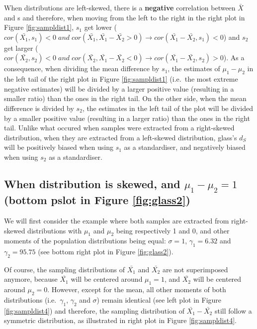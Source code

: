 \documentclass[
  man,floatsintext]{apa6}
\begin{document}
When distributions are left-skewed, there is a \textbf{negative} correlation between \(\bar{X}\) and s and therefore, when moving from the left to the right in the right plot in Figure \ref{fig:sampldist1}, \(s_1\) get lower (\(cor(\bar{X_1},s_1) < 0 \; and \; cor(\bar{X_1},\bar{X_1}-\bar{X_2}>0) \rightarrow cor(\bar{X_1}-\bar{X_2},s_1)<0\)) and \(s_2\) get larger (\(cor(\bar{X_2},s_2) < 0 \; and \; cor(\bar{X_2},\bar{X_1}-\bar{X_2}<0) \rightarrow cor(\bar{X_1}-\bar{X_2},s_2)>0\)). As a consequence, when dividing the mean difference by \(s_1\), the estimates of \(\mu_1-\mu_2\) in the left tail of the right plot in Figure \ref{fig:sampldist1} (i.e.~the most extreme negative estimates) will be divided by a larger positive value (resulting in a smaller ratio) than the ones in the right tail. On the other side, when the mean difference is divided by \(s_2\), the estimates in the left tail of the plot will be divided by a smaller positive value (resulting in a larger ratio) than the ones in the right tail. Unlike what occured when samples were extracted from a right-skewed distribution, when they are extracted from a left-skewed distribution, glass's \(d_S\) will be positively biased when using \(s_1\) as a standardiser, and negatively biased when using \(s_2\) as a standardiser.

\hypertarget{when-distribution-is-skewed-and-mu_1-mu_21-bottom-pslot-in-figure}{%
\subsection{\texorpdfstring{When distribution is skewed, and \textbf{\(\mu_1-\mu_2=1\)} (bottom pslot in Figure \ref{fig:glass2})}{When distribution is skewed, and \textbackslash mu\_1-\textbackslash mu\_2=1 (bottom pslot in Figure )}}\label{when-distribution-is-skewed-and-mu_1-mu_21-bottom-pslot-in-figure}}

We will first consider the example where both samples are extracted from right-skewed distributions with \(\mu_1\) and \(\mu_2\) being respectively 1 and 0, and other moments of the population distributions being equal: \(\sigma=1\), \(\gamma_1=6.32\) and \(\gamma_2=95.75\) (see bottom right plot in Figure \ref{fig:glass2}).

Of course, the sampling distributions of \(\bar{X_1}\) and \(\bar{X_2}\) are not superimposed anymore, because \(\bar{X_1}\) will be centered around \(\mu_1=1\), and \(\bar{X_2}\) will be centered around \(\mu_2=0\). However, except for the mean, all other moments of both distributions (i.e.~\(\gamma_1\), \(\gamma_2\) and \(\sigma\)) remain identical (see left plot in Figure \ref{fig:sampldist4}) and therefore, the sampling distribution of \(\bar{X_1}-\bar{X_2}\) still follow a symmetric distribution, as illustrated in right plot in Figure \ref{fig:sampldist4}.
\end{document}
